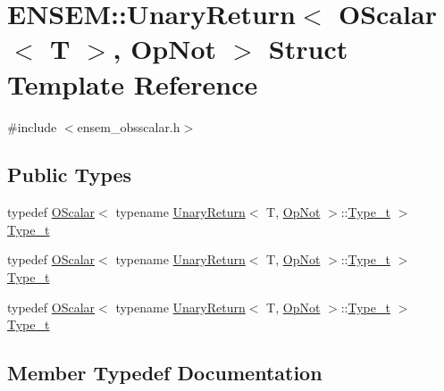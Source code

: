 \hypertarget{structENSEM_1_1UnaryReturn_3_01OScalar_3_01T_01_4_00_01OpNot_01_4}{}\section{E\+N\+S\+EM\+:\+:Unary\+Return$<$ O\+Scalar$<$ T $>$, Op\+Not $>$ Struct Template Reference}
\label{structENSEM_1_1UnaryReturn_3_01OScalar_3_01T_01_4_00_01OpNot_01_4}


{\ttfamily \#include $<$ensem\+\_\+obsscalar.\+h$>$}

\subsection*{Public Types}
\begin{DoxyCompactItemize}
\item 
typedef \mbox{\hyperlink{classENSEM_1_1OScalar}{O\+Scalar}}$<$ typename \mbox{\hyperlink{structENSEM_1_1UnaryReturn}{Unary\+Return}}$<$ T, \mbox{\hyperlink{structENSEM_1_1OpNot}{Op\+Not}} $>$\+::\mbox{\hyperlink{structENSEM_1_1UnaryReturn_3_01OScalar_3_01T_01_4_00_01OpNot_01_4_a0a3874d32de1d033bfe55bfd921d73be}{Type\+\_\+t}} $>$ \mbox{\hyperlink{structENSEM_1_1UnaryReturn_3_01OScalar_3_01T_01_4_00_01OpNot_01_4_a0a3874d32de1d033bfe55bfd921d73be}{Type\+\_\+t}}
\item 
typedef \mbox{\hyperlink{classENSEM_1_1OScalar}{O\+Scalar}}$<$ typename \mbox{\hyperlink{structENSEM_1_1UnaryReturn}{Unary\+Return}}$<$ T, \mbox{\hyperlink{structENSEM_1_1OpNot}{Op\+Not}} $>$\+::\mbox{\hyperlink{structENSEM_1_1UnaryReturn_3_01OScalar_3_01T_01_4_00_01OpNot_01_4_a0a3874d32de1d033bfe55bfd921d73be}{Type\+\_\+t}} $>$ \mbox{\hyperlink{structENSEM_1_1UnaryReturn_3_01OScalar_3_01T_01_4_00_01OpNot_01_4_a0a3874d32de1d033bfe55bfd921d73be}{Type\+\_\+t}}
\item 
typedef \mbox{\hyperlink{classENSEM_1_1OScalar}{O\+Scalar}}$<$ typename \mbox{\hyperlink{structENSEM_1_1UnaryReturn}{Unary\+Return}}$<$ T, \mbox{\hyperlink{structENSEM_1_1OpNot}{Op\+Not}} $>$\+::\mbox{\hyperlink{structENSEM_1_1UnaryReturn_3_01OScalar_3_01T_01_4_00_01OpNot_01_4_a0a3874d32de1d033bfe55bfd921d73be}{Type\+\_\+t}} $>$ \mbox{\hyperlink{structENSEM_1_1UnaryReturn_3_01OScalar_3_01T_01_4_00_01OpNot_01_4_a0a3874d32de1d033bfe55bfd921d73be}{Type\+\_\+t}}
\end{DoxyCompactItemize}


\subsection{Member Typedef Documentation}
\mbox{\label{structENSEM_1_1UnaryReturn_3_01OScalar_3_01T_01_4_00_01OpNot_01_4_a0a3874d32de1d033bfe55bfd921d73be}} 
